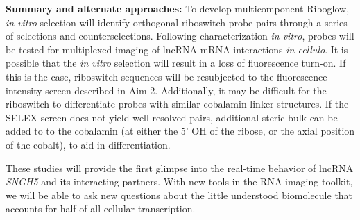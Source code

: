 


\textbf{Summary and alternate approaches:}
To develop multicomponent Riboglow, \textit{in vitro} selection will identify orthogonal riboswitch-probe pairs through a series of selections and counterselections.
Following characterization \textit{in vitro}, probes will be tested for multiplexed imaging of lncRNA-mRNA interactions \textit{in cellulo}. It is possible that the \textit{in vitro} selection will result in a loss of fluorescence turn-on. If this is the case, riboswitch sequences will be resubjected to the fluorescence intensity screen described in Aim 2. Additionally, it may be difficult for the riboswitch to differentiate probes with similar cobalamin-linker structures. If the SELEX screen does not yield well-resolved pairs, additional steric bulk can be added to to the cobalamin (at either the 5' OH of the ribose, or the axial position of the cobalt), to aid in differentiation.

These studies will provide the first glimpse into the real-time behavior of lncRNA \textit{SNGH5} and its interacting partners. With new tools in the RNA imaging toolkit, we will be able to ask new questions about the little understood biomolecule that accounts for half of all cellular transcription. 

